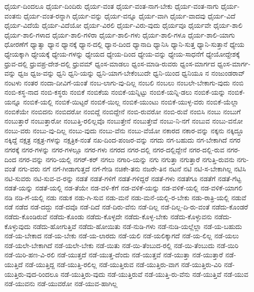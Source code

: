 {ಧೈರ್ಯ-ದಿಂದಲೂ
ಧೈರ್ಯ-ದಿಂದಿರು
ಧೈರ್ಯ-ವಂತ
ಧೈರ್ಯ-ವಂತ-ನಾಗ-ಬೇಕು
ಧೈರ್ಯ-ವಂತ-ನಾಗು
ಧೈರ್ಯ-ವಂತನು
ಧೈರ್ಯ-ವಂತ-ರನ್ನಾಗಿ
ಧೈರ್ಯ-ವನ್ನು
ಧೈರ್ಯ-ವನ್ನೂ
ಧೈರ್ಯ-ವಾಗಿ
ಧೈರ್ಯ-ವಾದವು
ಧೈರ್ಯ-ವಿದೆ
ಧೈರ್ಯ-ವಿದೆಯೆ
ಧೈರ್ಯ-ವಿದೆಯೋ
ಧೈರ್ಯ-ವಿರಲಿ
ಧೈರ್ಯ-ವಿರು-ವುದು
ಧೈರ್ಯವೂ
ಧೈರ್ಯವೇ
ಧೈರ್ಯ-ಶಾಲಿ
ಧೈರ್ಯ-ಶಾಲಿ-ಗಳಾದ
ಧೈರ್ಯ-ಶಾಲಿ-ಗಳಿರಾ
ಧೈರ್ಯ-ಶಾಲಿ-ಗಳು
ಧೈರ್ಯ-ಶಾಲಿ-ಗಳೂ
ಧೈರ್ಯ-ಶಾಲಿ-ಯಾಗು
ಧೋರಣೆಗೆ
ಧ್ಯಾತ್ವಾ
ಧ್ಯಾನ
ಧ್ಯಾನಕ್ಕೆ
ಧ್ಯಾನ-ದಲ್ಲಿ
ಧ್ಯಾನ-ದಿಂದ
ಧ್ಯಾನಾದಿ
ಧ್ಯಾನಿಸಿ
ಧ್ಯಾನಿ-ಸುತ್ತ
ಧ್ಯಾನಿ-ಸುತ್ತಾನೆ
ಧ್ಯೇಯ
ಧ್ಯೇಯಕ್ಕಾಗಿ
ಧ್ಯೇಯಕ್ಕೆ
ಧ್ಯೇಯ-ಗಳನ್ನು
ಧ್ಯೇಯದ
ಧ್ಯೇಯ-ದಿಂದ
ಧ್ಯೇಯ-ವನ್ನು
ಧ್ಯೇಯ-ಸಾಧನೆಗೆ
ಧ್ಯೇಯೋದ್ದೇಶಕ್ಕೆ
ಧ್ರುವ-ದಲ್ಲಿ
ಧ್ರುವಪ್ರ-ದೇಶ-ದಲ್ಲಿ
ಧ್ರುವಮ್
ಧ್ವಂಸ-ಮಾಡಲು
ಧ್ವಂಸ-ಮಾಡಿ-ರುವರು
ಧ್ವಂಸ-ಮಾರ್ಗದ
ಧ್ವಂಸ-ಮಾರ್ಗ-ವನ್ನು
ಧ್ವಜ
ಧ್ವಜ-ವನ್ನು
ಧ್ವನಿ
ಧ್ವನಿ-ಯನ್ನು
ಧ್ವನಿ-ಯಾಗ-ಬೇಕೆಂಬುದೇ
ಧ್ವನಿ-ಯಿಂದ
ಧ್ವನಿಯೂ
ನ
ನಂಜುಂಡರಾವ್
ನಂಟಳು
ನಂತರ
ನಂದಾ-ದೀವಿಗೆ-ಯಂತೆ
ನಂಬ-ಲಾಗು-ವು-ದಿಲ್ಲ
ನಂಬಲಿ
ನಂಬಲು
ನಂಬಲೇ-ಬೇಕಾಗು-ವುದು
ನಂಬಿ
ನಂಬಿ-ಕಸ್ಥ-ನಾದ
ನಂಬಿ-ಕಸ್ಥರು
ನಂಬಿಕೆ
ನಂಬಿಕೆಯ
ನಂಬಿಕೆ-ಯನ್ನಿಟ್ಟು
ನಂಬಿಕೆ-ಯನ್ನಿ-ಡಲು
ನಂಬಿಕೆ-ಯನ್ನು
ನಂಬಿಕೆ-ಯನ್ನೂ
ನಂಬಿಕೆ-ಯಲ್ಲಿ
ನಂಬಿಕೆ-ಯಿಟ್ಟರೆ
ನಂಬಿಕೆ-ಯಿಲ್ಲ
ನಂಬಿಕೆ-ಯುಂಟು
ನಂಬಿಕೆ-ಯುಳ್ಳ-ವರು
ನಂಬಿಕೆ-ಯೆಲ್ಲಾ
ನಂಬಿಕೆಯೇ
ನಂಬಿದನು
ನಂಬಿದರೋ
ನಂಬಿದ್ದೆ
ನಂಬಿದ್ದೇನೆ
ನಂಬಿ-ರುವರೋ
ನಂಬಿ-ರುವೆ
ನಂಬಿಸಿ
ನಂಬು
ನಂಬುಗೆ
ನಂಬುತ್ತಾರೆ
ನಂಬುತ್ತಾರೋ
ನಂಬುತ್ತಿ-ರಲಿಲ್ಲವೊ
ನಂಬುತ್ತೇನೆ
ನಂಬುತ್ತೇವೆ
ನಂಬು-ನಿ-ನಗೆ
ನಂಬುವ
ನಂಬು-ವನೋ
ನಂಬು-ವರು
ನಂಬು-ವು-ದಿಲ್ಲ
ನಂಬು-ವುದು
ನಂಬು-ವೆನು
ನಂಬು-ವೆಯೋ
ನಕಾರದ
ನಕಾರ-ವನ್ನು
ನಕ್ಕನು
ನಕ್ಕಿದ್ದೂ
ನಕ್ಕಿದ್ದೆ
ನಕ್ಷತ್ರ
ನಕ್ಷತ್ರ-ಗಳನ್ನು
ನಕ್ಷತ್ರಿಕ-ನಂತೆ
ನಖ-ದಿಂದ-ಪಂಜರ-ವನ್ನು
ನಗದು
ನಗ-ಬಹುದು
ನಗ-ಬೇಕಾಗಿದೆ
ನಗರ
ನಗರಕ್ಕೆ
ನಗರ-ಗಳನ್ನು
ನಗರ-ಗಳಲ್ಲೂ
ನಗರ-ಗಳು
ನಗರದ
ನಗರ-ದಲ್ಲಿ
ನಗರ-ದಲ್ಲಿದ್ದೇನೆ
ನಗರ-ದಲ್ಲಿ-ರುವ
ನಗರ-ದಿಂದ
ನಗರ-ವನ್ನು
ನಗರಿ-ಯಲ್ಲಿ
ನಗರ್-ಕರ್
ನಗಲು
ನಗಾರಿ-ಯನ್ನು
ನಗು
ನಗುತ್ತಾ
ನಗುತ್ತಾರೆ
ನಗುತ್ತಿ-ರುವನು
ನಗು-ವಂತೆ
ನಗು-ವರು
ನಗೆ
ನಗೆ-ಗೀಡಾಗುತ್ತದೆ
ನಗೆ-ಗೇಡಿ
ನಚಿಕೇ-ತನು
ನಜರೇ-ತಿನ
ನಟನೆ
ನಟಿ
ನಟಿ-ಸ-ಬೇಕಾಗಿಲ್ಲ
ನಟಿಸಿ
ನಟಿ-ಸುವರು
ನಟಿ-ಸುವ-ವ-ರನ್ನು
ನಡತೆ
ನಡತೆ-ಗಳಿಗೆ
ನಡತೆ-ಗಳಿದ್ದರೆ
ನಡತೆ-ಗಳು
ನಡತೆಗೂ
ನಡತೆಗೆ
ನಡತೆ-ಗೆಟ್ಟ
ನಡತೆ-ಯನ್ನು
ನಡತೆ-ಯಲ್ಲಿ
ನಡ-ತೆಯೇ
ನಡ-ವಳಿ-ಕೆಗೆ
ನಡ-ವಳಿಕೆ-ಯನ್ನು
ನಡ-ವಳಿಕೆ-ಯಲ್ಲಿ
ನಡ-ವಳಿಕೆ-ಯಾಗಲಿ
ನಡಿ
ನಡಿ-ಗೆ-ಯಲ್ಲಿ
ನಡು
ನಡುಕ
ನಡು-ಗಿ-ಸುವ
ನಡು-ಮನೆ
ನಡು-ಮನೆ-ಯಲ್ಲಿ-ರ-ಬೇಕು
ನಡು-ರಾತ್ರಿ-ಯಲ್ಲಿ
ನಡುವೆ
ನಡೆ
ನಡೆದ
ನಡೆ-ದದ್ದು
ನಡೆ-ದವೊ
ನಡೆ-ದಿದೆ
ನಡೆ-ದಿರು-ವೆನು
ನಡೆ-ದಿಲ್ಲ
ನಡೆ-ದಿಲ್ಲ-ದಿ-ರು-ವಂತೆ
ನಡೆದು-ಕೊಂಡರೆ
ನಡೆದು-ಕೊಂಡಿರುವೆ
ನಡೆದು-ಕೊಂಡು
ನಡೆದು-ಕೊಳ್ಳದೇ
ನಡೆದು-ಕೊಳ್ಳ-ಬೇಕು
ನಡೆದು-ಕೊಳ್ಳುವನು
ನಡೆದು-ಕೊಳ್ಳುವುದು
ನಡೆದು-ಹೋಗುತ್ತಿವೆ
ನಡೆದು-ಹೋಯಿತು
ನಡೆ-ನುಡಿ-ಗಳು
ನಡೆ-ನುಡಿ-ಯಲ್ಲೆಲ್ಲಾ
ನಡೆ-ಯ-ಬಹುದು
ನಡೆ-ಯ-ಬೇಕಾದ
ನಡೆ-ಯ-ಬೇಕು
ನಡೆ-ಯ-ಲಾರದು
ನಡೆ-ಯಲಿ
ನಡೆ-ಯಲಿಕ್ಕಾಗದೆ
ನಡೆ-ಯ-ಲಿಲ್ಲ
ನಡೆ-ಯಲು
ನಡೆ-ಯಲೇ-ಬೇಕಾಗಿದೆ
ನಡೆ-ಯಲೇ-ಬೇಕು
ನಡೆ-ಯಿತು
ನಡೆ-ಯಿ-ತೆಂಬುದ-ರಲ್ಲಿ
ನಡೆ-ಯಿ-ತೆಂಬುದು
ನಡೆ-ಯಿರಿ
ನಡೆ-ಯಿರಿ-ಹಣ-ವಿ-ರಲಿ
ನಡೆ-ಯುತ್ತದೆ
ನಡೆ-ಯುತ್ತ-ದೆಂದು
ನಡೆ-ಯುತ್ತವೆ
ನಡೆ-ಯುತ್ತಾ
ನಡೆ-ಯುತ್ತಾರೆ
ನಡೆ-ಯುತ್ತಿದೆ
ನಡೆ-ಯುತ್ತಿದ್ದ
ನಡೆ-ಯುತ್ತಿ-ರಲಿಲ್ಲ
ನಡೆ-ಯುತ್ತಿರುವ
ನಡೆ-ಯುತ್ತಿರು-ವಾಗ
ನಡೆ-ಯುತ್ತಿರು-ವಿರಿ
ನಡೆ-ಯುತ್ತಿರು-ವುದ-ರಿಂದಲೂ
ನಡೆ-ಯುತ್ತಿರು-ವುದು
ನಡೆ-ಯುತ್ತಿರುವೆ
ನಡೆ-ಯುತ್ತಿ-ರು-ವೆನು
ನಡೆ-ಯುತ್ತಿವೆ
ನಡೆ-ಯುವ
ನಡೆ-ಯುವನು
ನಡೆ-ಯುವರೋ
ನಡೆ-ಯುವ-ಹಾಗಿಲ್ಲ
}
